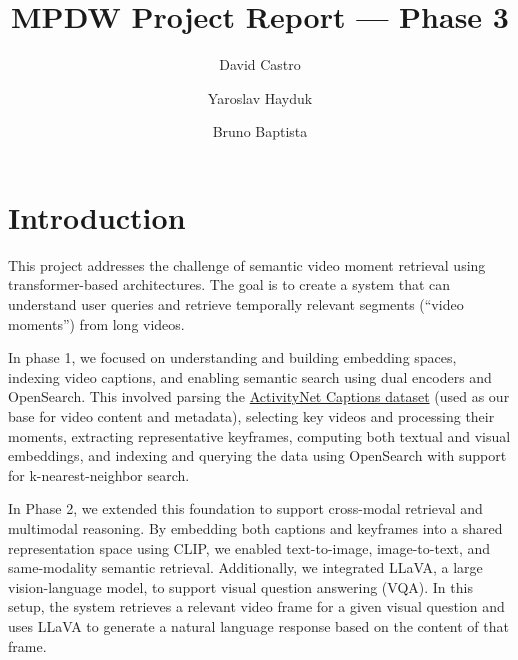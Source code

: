 \documentclass[runningheads]{llncs}
\begin{document}
\raggedbottom
\sloppy

\setlength{\textfloatsep}{10pt plus 2pt minus 4pt}
\setlength{\intextsep}{10pt plus 2pt minus 4pt}

\title{MPDW Project Report --- Phase 3}
\author{David Castro \and
Yaroslav Hayduk \and
Bruno Baptista}
%
%
%
\maketitle              %
%


%
%
%
\vspace{2\baselineskip plus 0.5\baselineskip minus 0.5\baselineskip}

\section{Introduction}
This project addresses the challenge of semantic video moment retrieval using transformer-based architectures. The goal is to create a system that can understand user queries and retrieve temporally relevant segments (``video moments'') from long videos.

In phase 1, we focused on understanding and building embedding spaces, indexing video captions, and enabling semantic search using dual encoders and OpenSearch. This involved parsing the \href{https://huggingface.co/datasets/HuggingFaceM4/ActivitiyNet_Captions}{ActivityNet Captions dataset} (used as our base for video content and metadata), selecting key videos and processing their moments, extracting representative keyframes, computing both textual and visual embeddings, and indexing and querying the data using OpenSearch with support for k-nearest-neighbor search.

In Phase 2, we extended this foundation to support cross-modal retrieval and multimodal reasoning. By embedding both captions and keyframes into a shared representation space using CLIP, we enabled text-to-image, image-to-text, and same-modality semantic retrieval. Additionally, we integrated LLaVA, a large vision-language model, to support visual question answering (VQA). In this setup, the system retrieves a relevant video frame for a given visual question and uses LLaVA to generate a natural language response based on the content of that frame.
\end{document}
